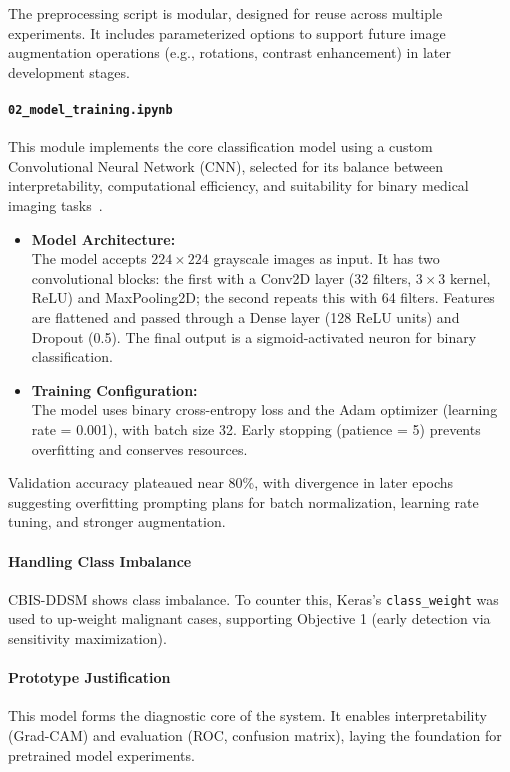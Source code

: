 \documentclass[12pt]{article}
\begin{document}
The preprocessing script is modular, designed for reuse across multiple experiments. It includes parameterized options to support future image augmentation operations (e.g., rotations, contrast enhancement) in later development stages.

\vspace{0.5em}

\paragraph{\texttt{02\_model\_training.ipynb}}
This module implements the core classification model using a custom Convolutional Neural Network (CNN), selected for its balance between interpretability, computational efficiency, and suitability for binary medical imaging tasks~\cite{17}.

\begin{itemize}
    \item \textbf{Model Architecture:} \\
    The model accepts $224 \times 224$ grayscale images as input. It has two convolutional blocks: the first with a Conv2D layer (32 filters, $3 \times 3$ kernel, ReLU) and MaxPooling2D; the second repeats this with 64 filters. Features are flattened and passed through a Dense layer (128 ReLU units) and Dropout (0.5). The final output is a sigmoid-activated neuron for binary classification.
    
    \item \textbf{Training Configuration:} \\
    The model uses binary cross-entropy loss and the Adam optimizer (learning rate = 0.001), with batch size 32. Early stopping (patience = 5) prevents overfitting and conserves resources.
\end{itemize}

Validation accuracy plateaued near 80\%, with divergence in later epochs suggesting overfitting prompting plans for batch normalization, learning rate tuning, and stronger augmentation.

\paragraph{Handling Class Imbalance} CBIS-DDSM shows class imbalance. To counter this, Keras’s \texttt{class\_weight} was used to up-weight malignant cases, supporting Objective 1 (early detection via sensitivity maximization).

\paragraph{Prototype Justification} This model forms the diagnostic core of the system. It enables interpretability (Grad-CAM) and evaluation (ROC, confusion matrix), laying the foundation for pretrained model experiments.
\end{document}
